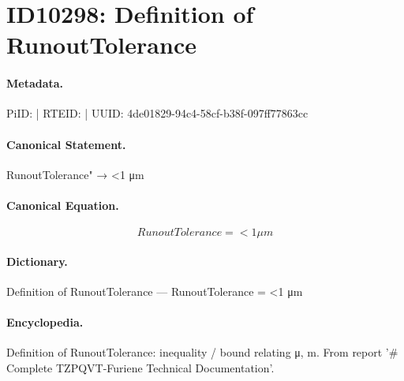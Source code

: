 \section*{ID10298: Definition of RunoutTolerance}
\paragraph{Metadata.}
PiID:  | RTEID:  | UUID: 4de01829-94c4-58cf-b38f-097ff77863cc

\paragraph{Canonical Statement.}
RunoutTolerance" → <1 μm

\paragraph{Canonical Equation.}
\[
RunoutTolerance = <1 μm
\]

\paragraph{Dictionary.}
Definition of RunoutTolerance — RunoutTolerance = <1 μm

\paragraph{Encyclopedia.}
Definition of RunoutTolerance: inequality / bound relating μ, m. From report '\# Complete TZPQVT-Furiene Technical Documentation'.
